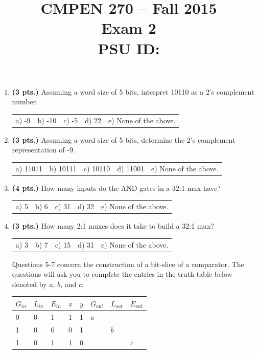 \documentclass{article}
\begin{document}
\newcommand{\bs}{\backslash}

\title{
\Large{CMPEN 270 -- Fall 2015}\\
\normalsize{Exam 2}\\
PSU ID:}
\date{}
\maketitle{}

\begin{enumerate}
\item {\bf (3 pts.)} Assuming a word size of 5 bits, interpret 10110 
as a 2's complement number.

\begin{tabular}{p{0.6in} p{0.6in} p{0.6in} p{0.6in} l}
a) -9 & b) -10 & c) -5 & d) 22 & e) None of the above.
\end{tabular}

\item {\bf (3 pts.)} Assuming a word size of 5 bits, determine the 2's complement
representation of -9.

\begin{tabular}{p{0.6in} p{0.6in} p{0.6in} p{0.6in} l}
a) 11011 & b) 10111 & c) 10110 & d) 11001 & e) None of the above.
\end{tabular}

\item {\bf (4 pts.)} How many inputs do the AND gates in a 32:1 mux have?
\begin{tabular}{p{0.6in} p{0.6in} p{0.6in} p{0.6in} l}
a) 5 & b) 6 & c) 31 & d) 32 & e) None of the above.
\end{tabular}

\item {\bf (3 pts.)} How many 2:1 muxes does it take to build a 32:1 mux?

\begin{tabular}{p{0.6in} p{0.6in} p{0.6in} p{0.6in} l}
a) 3 & b) 7 & c) 15 & d) 31 & e) None of the above.
\end{tabular}

Questions 5-7 concern the construction of a bit-slice of a comparator.  
The questions will ask you to complete the entries in the truth table 
below denoted by $a$, $b$, and $c$.

\begin{tabular}{l|l|l|l|l||l|l|l}
$G_{in}$ & $L_{in}$ & $E_{in}$ & $x$ & $y$ & $G_{out}$ & $L_{out}$ & $E_{out}$ \\ \hline
    0    &    0     &     1    &  1  &  1  &   $a$     &           &  \\ \hline
    1    &    0     &     0    &  0  &  1  &           &   $b$     &  \\ \hline
    1    &    0     &     1    &  1  &  0  &           &           &  $c$    \\
\end{tabular}


\end{enumerate}
\end{document}
